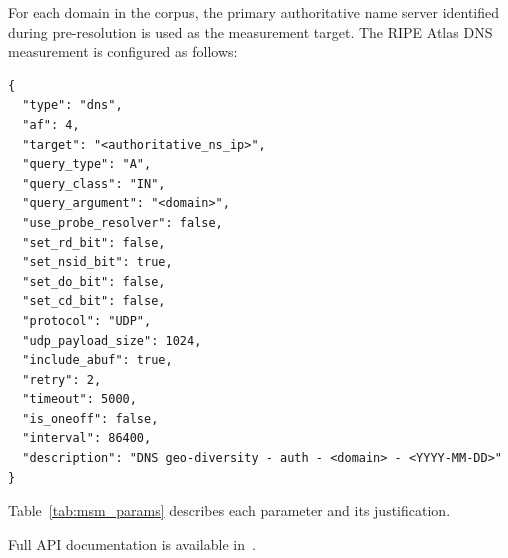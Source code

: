 For each domain in the corpus, the primary authoritative name server identified during pre-resolution is used as the measurement target. The RIPE Atlas \ac{DNS} measurement is configured as follows:


\begin{lstlisting}[style=json]
{
  "type": "dns",
  "af": 4,
  "target": "<authoritative_ns_ip>",
  "query_type": "A",
  "query_class": "IN",
  "query_argument": "<domain>",
  "use_probe_resolver": false,
  "set_rd_bit": false,
  "set_nsid_bit": true,
  "set_do_bit": false,
  "set_cd_bit": false,
  "protocol": "UDP",
  "udp_payload_size": 1024,
  "include_abuf": true,
  "retry": 2,
  "timeout": 5000,
  "is_oneoff": false,
  "interval": 86400,
  "description": "DNS geo-diversity - auth - <domain> - <YYYY-MM-DD>"
}

\end{lstlisting}

Table~\ref{tab:msm_params} describes each parameter and its justification.

Full API documentation is available in~\cite{RIPEAtlasDocs2026}.

